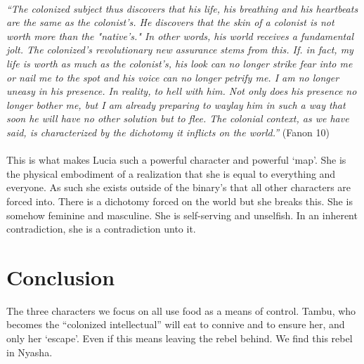 \documentclass{article}
\begin{document}
\paragraph{}
\textit {``The colonized subject thus discovers that his life, his breathing and his heartbeats are the same as the colonist's. He discovers that the skin of a colonist is not worth more than the "native's." In other words, his world receives a fundamental jolt. The colonized's revolutionary new assurance stems from this. If. in fact, my life is worth as much as the colonist's, his look can no longer strike fear into me or nail me to the spot and his voice can no longer petrify me. I am no longer uneasy in his presence. In reality, to hell with him. Not only does his presence no longer bother me, but I am already preparing to waylay him in such a way that soon he will have no other solution but to flee. The colonial context, as we have said, is characterized by the dichotomy it inflicts on the world.''} (Fanon 10)
\paragraph{}
This is what makes Lucia such a powerful character and powerful `map'. She is the physical embodiment of a realization that she is equal to everything and everyone. As such she exists outside of the binary's that all other characters are forced into. There is a dichotomy forced on the world but she breaks this.  She is somehow feminine and masculine. She is self-serving and unselfish. In an inherent contradiction, she is a contradiction unto it. 




\section*{Conclusion}
The three characters we focus on all use food as a means of control. Tambu, who becomes the ``colonized intellectual'' will eat to connive and to ensure her, and only her `escape'. Even if this means leaving the rebel behind. We find this rebel in Nyasha.  
\end{document}
